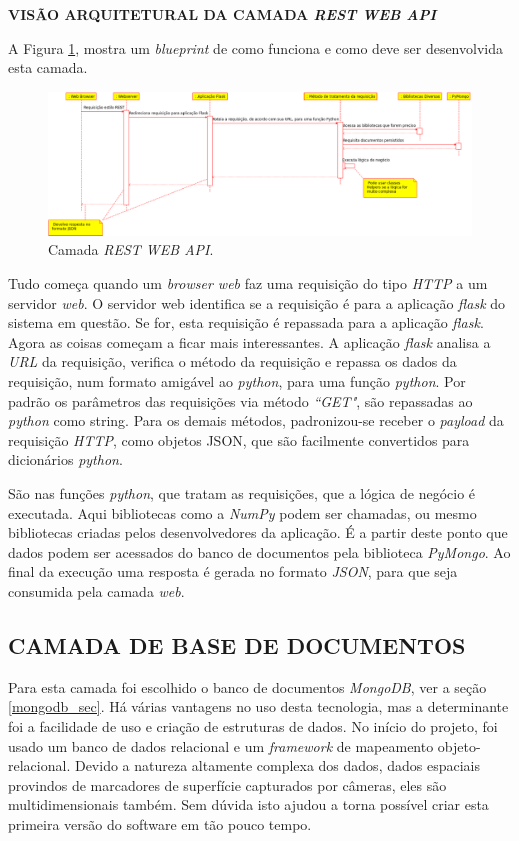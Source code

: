 \textbf{VISÃO ARQUITETURAL DA CAMADA \emph{REST WEB API}} 

A Figura \ref{camada_api}, mostra um \emph{blueprint} de como funciona e como deve ser desenvolvida esta camada.
\begin{figure}[ht]
	\centering
	\includegraphics[width=15cm]{figuras/camada_api.eps}
	\caption{Camada \emph{REST WEB API}.}
	\label{camada_api}
\end{figure}

Tudo começa quando um \emph{browser web} faz uma requisição do tipo \emph{HTTP} a um servidor \emph{web}. 
O servidor web identifica se a requisição é para a aplicação \emph{flask} do sistema em questão. 
Se for, esta requisição é repassada para a aplicação \emph{flask}. 
Agora as coisas começam a ficar mais interessantes. 
A aplicação \emph{flask} analisa a \emph{URL} da requisição, verifica o método da requisição e repassa os dados da requisição, num formato amigável ao \emph{python}, para uma função \emph{python}. 
Por padrão os parâmetros das requisições via método \emph{``GET"}, são repassadas ao \emph{python} como string. 
Para os demais métodos, padronizou-se receber o \emph{payload} da requisição \emph{HTTP}, como objetos JSON, que são facilmente convertidos para dicionários \emph{python}.

São nas funções \emph{python}, que tratam as requisições, que a lógica de negócio é executada. 
Aqui bibliotecas como a \emph{NumPy} podem ser chamadas, ou mesmo bibliotecas criadas pelos desenvolvedores da aplicação. 
É a partir deste ponto que dados podem ser acessados do banco de documentos pela biblioteca \emph{PyMongo}. 
Ao final da execução uma resposta é gerada no formato \emph{JSON}, para que seja consumida pela camada \emph{web}.



\subsection {CAMADA DE BASE DE DOCUMENTOS}

Para esta camada foi escolhido o banco de documentos \emph{MongoDB}, ver a seção \ref{mongodb_sec}. 
Há várias vantagens no uso desta tecnologia, mas a determinante foi a facilidade de uso e criação de estruturas de dados. 
No início do projeto, foi usado um banco de dados relacional e um \emph{framework} de mapeamento objeto-relacional. 
Devido a natureza altamente complexa dos dados, dados espaciais provindos de marcadores de superfície capturados por câmeras, eles são multidimensionais também. 
Sem dúvida isto ajudou a torna possível criar esta primeira versão do software em tão pouco tempo.


